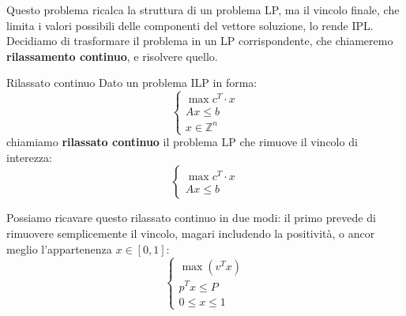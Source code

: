 \documentclass[a4paper,11pt]{article}
\begin{document}
Questo problema ricalca la struttura di un problema LP, ma il vincolo finale, che limita i valori possibili delle componenti del vettore soluzione, lo rende IPL.
Decidiamo di trasformare il problema in un LP corrispondente, che chiameremo \textbf{rilassamento continuo}, e risolvere quello.

\begin{definition}{Rilassato continuo}
	Dato un problema ILP in forma:
	\[
		\begin{cases}
			\max c^T \cdot x \\ 
			Ax \leq b \\ 
			x \in \mathbb{Z}^n
		\end{cases}
	\]
	chiamiamo \textbf{rilassato continuo} il problema LP che rimuove il vincolo di interezza:
	\[
		\begin{cases}
			\max c^T \cdot x \\ 
			Ax \leq b 
		\end{cases}	
	\]
\end{definition}

Possiamo ricavare questo rilassato continuo in due modi: il primo prevede di rimuovere semplicemente il vincolo, magari includendo la positività, o ancor meglio l'appartenenza $x \in [0, 1]$:
\[
	\begin{cases}
		\max \left( v^T x \right) \\
		p^T x \leq P \\
		0 \leq x \leq 1
	\end{cases}
\]
\end{document}
